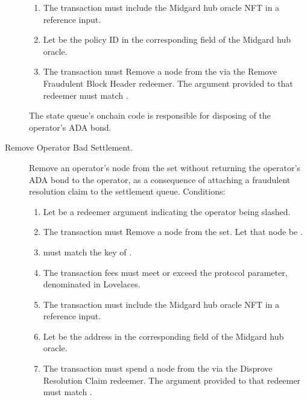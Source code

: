 \documentclass[../midgard.tex]{subfiles}
\begin{document}
\begin{description}
\begin{enumerate}
            \item The transaction must include the Midgard hub oracle NFT in a reference input.
            \item Let  be the policy ID in the corresponding field of the Midgard hub oracle.
            \item The transaction must Remove a node from the  via the Remove Fraudulent Block Header redeemer.
              The  argument provided to that redeemer must match .
        \end{enumerate}

        The state queue's onchain code is responsible for disposing of the operator's ADA bond.
    \item[Remove Operator Bad Settlement.] Remove an operator's node from the  set without returning the operator's ADA bond to the operator, as a consequence of attaching a fraudulent resolution claim to the settlement queue.
      Conditions:
        \begin{enumerate}
            \item Let  be a redeemer argument indicating the operator being slashed.
            \item The transaction must Remove a node from the  set.
              Let that node be .
            \item {} must match the key of .
            \item The transaction fees must meet or exceed the  protocol parameter, denominated in Lovelaces.
            \item The transaction must include the Midgard hub oracle NFT in a reference input.
            \item Let  be the address in the corresponding field of the Midgard hub oracle.
            \item The transaction must spend a node from the  via the Disprove Resolution Claim redeemer.
              The  argument provided to that redeemer must match .
        \end{enumerate}


\end{description}
\end{document}
